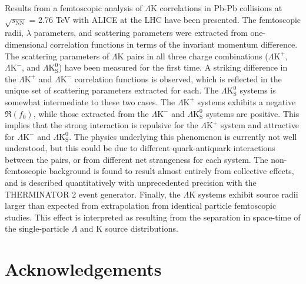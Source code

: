 \documentclass[ALICE,manyauthors]{cernphprep}
\newcommand{\Lam}{$\Lambda$\xspace}
\newcommand{\LamK}{$\Lambda$K\xspace}
\newcommand{\LamKchP}{$\Lambda\mathrm{K^{+}}$\xspace}
\newcommand{\LamKchM}{$\Lambda\mathrm{K^{-}}$\xspace}
\newcommand{\LamKs}{$\Lambda\mathrm{K^{0}_{S}}$\xspace}
\begin{document}
Results from a femtoscopic analysis of \LamK correlations in Pb-Pb collisions at $\sqrt{s_{\mathrm{NN}}}$ = 2.76 TeV with ALICE at the LHC have been presented.
The femtoscopic radii, $\lambda$ parameters, and scattering parameters were extracted from one-dimensional correlation functions in terms of the invariant momentum difference.
The scattering parameters of \LamK pairs in all three charge combinations (\LamKchP, \LamKchM, and \LamKs) have been measured for the first time.
A striking difference in the \LamKchP and \LamKchM correlation functions is observed, which is reflected in the unique set of scattering parameters extracted for each.
The \LamKs systems is somewhat intermediate to these two cases.
The \LamKchP systems exhibits a negative $\Re(f_{0})$, while those extracted from the \LamKchM and \LamKs systems are positive.
This implies that the strong interaction is repulsive for the \LamKchP system and attractive for \LamKchM and \LamKs.
The physics underlying this phenomenon is currently not well understood, but this could be due to different quark-antiquark interactions between the pairs, or from different net strangeness for each system. 
The non-femtoscopic background is found to result almost entirely from collective effects, and is described quantitatively with unprecedented precision with the THERMINATOR 2 event generator.
Finally, the \LamK systems exhibit source radii larger than expected from extrapolation from identical particle femtoscopic studies.
This effect is interpreted as resulting from the separation in space-time of the single-particle \Lam and K source distributions.

\newenvironment{acknowledgement}{\relax}{\relax}
\begin{acknowledgement}
\section*{Acknowledgements}
\end{acknowledgement}



\newpage
\appendix
%
\renewcommand{\thesubfigure}{\thefigure(\alph{subfigure})}
\makeatletter
\renewcommand{\p@subfigure}{}
\renewcommand{\@thesubfigure}{(\alph{subfigure})\hskip\subfiglabelskip}
%
\end{document}
